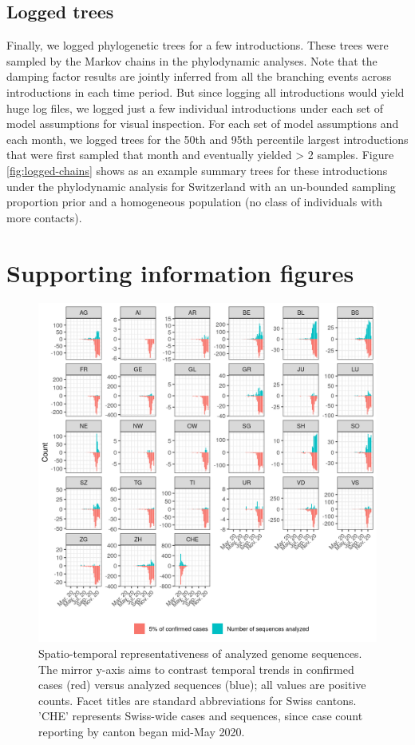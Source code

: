 \documentclass[9pt,twoside,lineno]{pnas-new}
\begin{document}
\subsection{Logged trees}
Finally, we logged phylogenetic trees for a few introductions. These trees were sampled by the Markov chains in the phylodynamic analyses. Note that the damping factor results are jointly inferred from all the branching events across introductions in each time period. But since logging all introductions would yield huge log files, we logged just a few individual introductions under each set of model assumptions for visual inspection. For each set of model assumptions and each month, we logged trees for the 50th and 95th percentile largest introductions that were first sampled that month and eventually yielded > 2 samples. Figure \ref{fig:logged-chains} shows as an example summary trees for these introductions under the phylodynamic analysis for Switzerland with an un-bounded sampling proportion prior and a homogeneous population (no class of individuals with more contacts).

\section{Supporting information figures}

\begin{figure}[h!]
\centering
\includegraphics[width = 0.8\linewidth]{figures/CHE_downsampling.png}
\caption{Spatio-temporal representativeness of analyzed genome sequences. The mirror y-axis aims to contrast temporal trends in confirmed cases (red) versus analyzed sequences (blue); all values are positive counts. Facet titles are standard abbreviations for Swiss cantons. 'CHE' represents Swiss-wide cases and sequences, since case count reporting by canton began mid-May 2020.}  
\label{fig:downsampling_representativeness}
\end{figure}
\end{document}
